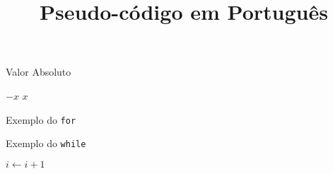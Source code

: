 \documentclass[a4paper]{article}
\title{Pseudo-código em Português}
\author{}
\date{\the\year}
\newcommand{\mei}{\leqslant} 		%
\begin{document}
\maketitle
\thispagestyle{empty}

\begin{algorithm}
\caption{Valor Absoluto}
\begin{algorithmic}[1]
    \State \Return $-x$
\Else
    \State \Return $x$
\EndIf
\EndFunction
\end{algorithmic}
\end{algorithm}

\begin{algorithm}
\caption{Exemplo do \texttt{for}}
\begin{algorithmic}[1]
   
\EndFor
\end{algorithmic}
\end{algorithm}

\begin{algorithm}
\caption{Exemplo do \texttt{while}}
\begin{algorithmic}[1]
\While {$i \mei n$}
  \State $i \gets i + 1$
\EndWhile
\end{algorithmic}
\end{algorithm}
\end{document}
